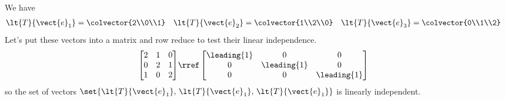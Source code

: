 We have 
%
\begin{align*}
\lt{T}{\vect{e}_1} &= \colvector{2\\0\\1}
&
\lt{T}{\vect{e}_2} &= \colvector{1\\2\\0}
&
\lt{T}{\vect{e}_3} &= \colvector{0\\1\\2}
\end{align*}
%
Let's put these vectors into a matrix and row reduce to test their linear independence.
%
\begin{align*}
\begin{bmatrix} 
2 & 1 & 0\\
0 & 2 & 1\\ 
1 & 0 & 2
\end{bmatrix}
&\rref
\begin{bmatrix} 
\leading{1} & 0 & 0\\ 
0 & \leading{1} & 0\\ 
0 & 0 & \leading{1} 
\end{bmatrix}
\end{align*}
%
so the set of vectors 
$\set{\lt{T}{\vect{e}_1},\, \lt{T}{\vect{e}_1},\,\lt{T}{\vect{e}_1}}$ 
is linearly independent.